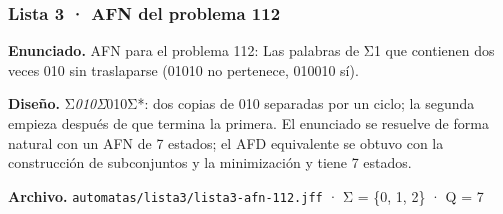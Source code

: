 
\hypertarget{lista-3-afn-del-problema-112}{%
\subsubsection{Lista 3 · AFN del problema 112}\label{lista-3-afn-del-problema-112}}

\textbf{Enunciado.} AFN para el problema 112: Las palabras de Σ1 que contienen dos veces 010 sin traslaparse (01010 no pertenece, 010010 sí).

\textbf{Diseño.} Σ\emph{010Σ}010Σ*: dos copias de 010 separadas por un ciclo; la segunda empieza después de que termina la primera. El enunciado se resuelve de forma natural con un AFN de 7 estados; el AFD equivalente se obtuvo con la construcción de subconjuntos y la minimización y tiene 7 estados.

\textbf{Archivo.} \texttt{automatas/lista3/lista3-afn-112.jff} · Σ = \{0, 1, 2\} · \textbar Q\textbar{} = 7

